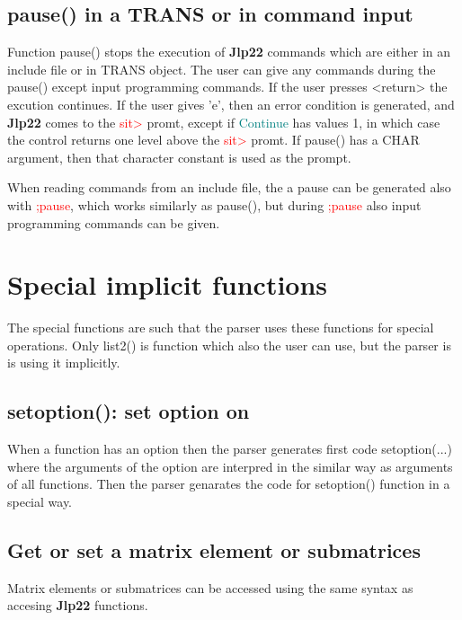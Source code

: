 \subsection{\textcolor{VioletRed}{pause}() in a TRANS or in command input}
\label{pause}
Function \textcolor{VioletRed}{pause}() stops the execution of \textbf{Jlp22} commands which are either in an
include file or in TRANS object. The user can give any commands during the
\textcolor{VioletRed}{pause}() except input programming commands.
If the user presses <return> the excution continues. If the user gives 'e', then
an error condition is generated, and \textbf{Jlp22} comes to the \textcolor{Red}{sit>} promt, except
if \textcolor{teal}{Continue} has values 1, in which case the control returns one level above
the \textcolor{Red}{sit>} promt.
If \textcolor{VioletRed}{pause}()  has a CHAR argument, then that character constant is used as
the prompt.
\begin{note}
When reading commands from an include file, the a pause can be generated also
with \textcolor{Red}{;pause}, which works similarly as \textcolor{VioletRed}{pause}(), but during \textcolor{Red}{;pause} also input programming
commands can be given.
\end{note}
\section{Special implicit functions}
\label{special}
The special functions are such that the parser uses these functions for special operations.
Only \textcolor{VioletRed}{list2}() is function which also the user can use, but the parser is
is using it implicitly.
\subsection{\textcolor{VioletRed}{setoption}(): set option on}
\label{setoption}
When a function has an option then the parser generates first code
\textcolor{VioletRed}{setoption}(...) where the arguments of the option are interpred in the similar way as
arguments of all functions. Then the parser genarates the code for
\textcolor{VioletRed}{setoption}() function in a special way.
\subsection{Get or set a matrix element or submatrices}
\label{getelem}
Matrix elements or submatrices can be accessed using the same syntax as
accesing \textbf{Jlp22} functions.

